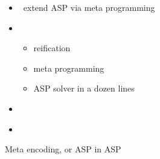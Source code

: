 \begin{frame}{\metasp}
  \begin{itemize}
  \item {} \ extend ASP via meta programming
  \item {} \
    \begin{itemize}
    \item reification
    \item meta programming
    \item ASP solver in a dozen lines
    \end{itemize}
  \item {}   \ \cite{gekasc11b,karoscwa21a}
  \item {} \ \cite{brderosc15b,digelurosc18a}
  \end{itemize}
\end{frame}
\begin{frame}[fragile,shrink=34]{Meta encoding, or ASP in ASP}
  \bigskip
  
\end{frame}
%
